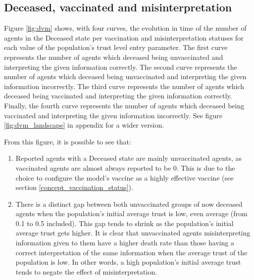 \pagebreak

\subsection{Deceased, vaccinated and misinterpretation}

Figure \ref{fig:dvm} shows, with four curves, the evolution in time of the number of agents in the Deceased state per vaccination and misinterpretation statuses for each value of the population's trust level entry parameter. The first curve represents the number of agents which deceased being unvaccinated and interpreting the given information correctly. The second curve represents the number of agents which deceased being unvaccinated and interpreting the given information incorrectly. The third curve represents the number of agents which deceased being vaccinated and interpreting the given information correctly. Finally, the fourth curve represents the number of agents which deceased being vaccinated and interpreting the given information incorrectly. See figure \ref{fig:dvm_landscape} in appendix for a wider version.

From this figure, it is possible to see that:
\begin{enumerate}
    \item Reported agents with a Deceased state are mainly unvaccinated agents, as vaccinated agents are almost always reported to be 0. This is due to the choice to configure the model's vaccine as a highly effective vaccine (see section \ref{concept_vaccination_status}).
    \item There is a distinct gap between both unvaccinated groups of now deceased agents when the population's initial average trust is low, even average (from 0.1 to 0.5 included). This gap tends to shrink as the population's initial average trust gets higher. It is clear that unvaccinated agents misinterpreting information given to them have a higher death rate than those having a correct interpretation of the same information when the average trust of the population is low. In other words, a high population's initial average trust tends to negate the effect of misinterpretation.
\end{enumerate}

